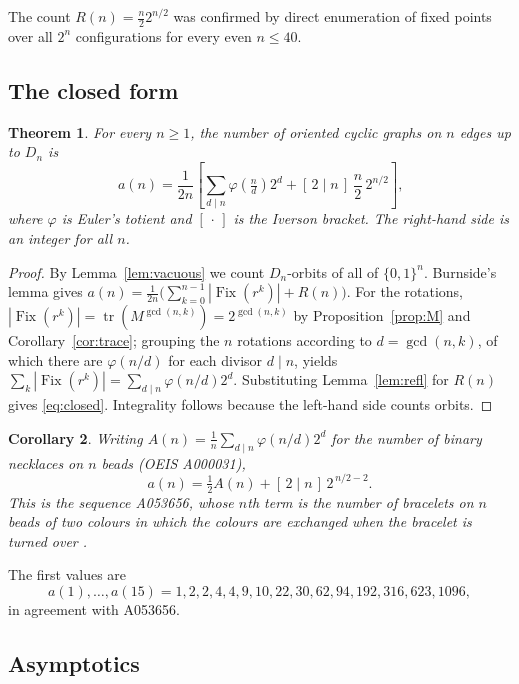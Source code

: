 \documentclass[11pt,a4paper]{article}
\theoremstyle{plain}
\newtheorem{theorem}{Theorem}[section]
\newtheorem{corollary}[theorem]{Corollary}
\theoremstyle{definition}
\theoremstyle{remark}
\DeclareMathOperator{\tr}{tr}
\DeclareMathOperator{\Fix}{Fix}
\newcommand{\Dih}{D_{n}}
\numberwithin{equation}{section}
\begin{document}
The count $R(n)=\frac{n}{2}2^{n/2}$ was confirmed by direct enumeration
of fixed points over all $2^{n}$ configurations for every even $n\le 40$.

\subsection{The closed form}

\begin{theorem}\label{thm:closed}
For every $n\ge 1$, the number of oriented cyclic graphs on $n$ edges up
to $\Dih$ is
\begin{equation}\label{eq:closed}
\boxed{\,a(n)=\frac{1}{2n}\!\left[\sum_{d\mid n}\varphi\!\left(\tfrac{n}{d}\right)2^{d}
    +[\,2\mid n\,]\,\frac{n}{2}\,2^{n/2}\right],}
\end{equation}
where $\varphi$ is Euler's totient and $[\,\cdot\,]$ is the Iverson
bracket. The right-hand side is an integer for all $n$.
\end{theorem}

\begin{proof}
By Lemma~\ref{lem:vacuous} we count $\Dih$-orbits of all of
$\{0,1\}^{n}$. Burnside's lemma gives
$a(n)=\frac{1}{2n}\bigl(\sum_{k=0}^{n-1}|\Fix(r^{k})|+R(n)\bigr)$. For the
rotations, $|\Fix(r^{k})|=\tr(M^{\gcd(n,k)})=2^{\gcd(n,k)}$ by
Proposition~\ref{prop:M} and Corollary~\ref{cor:trace}; grouping the $n$
rotations according to $d=\gcd(n,k)$, of which there are
$\varphi(n/d)$ for each divisor $d\mid n$, yields
$\sum_{k}|\Fix(r^{k})|=\sum_{d\mid n}\varphi(n/d)2^{d}$. Substituting
Lemma~\ref{lem:refl} for $R(n)$ gives \eqref{eq:closed}. Integrality
follows because the left-hand side counts orbits.
\end{proof}

\begin{corollary}\label{cor:oeis}
Writing $A(n)=\tfrac1n\sum_{d\mid n}\varphi(n/d)2^{d}$ for the number of
binary necklaces on $n$ beads {\upshape(OEIS A000031)},
\[
a(n)=\tfrac12 A(n)+[\,2\mid n\,]\,2^{\,n/2-2}.
\]
This is the sequence {\upshape A053656}, whose $n$th term is the number of
bracelets on $n$ beads of two colours in which the colours are exchanged
when the bracelet is turned over \textup{\cite{oeisA053656,pisanski}}.
\end{corollary}

The first values are
\[
a(1),\dots,a(15)=1,2,2,4,4,9,10,22,30,62,94,192,316,623,1096,
\]
in agreement with A053656.

\subsection{Asymptotics}
\end{document}

